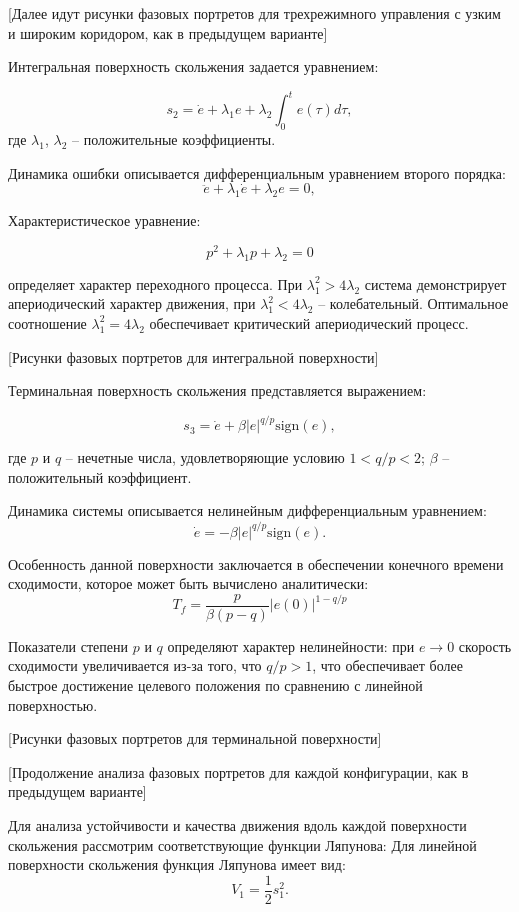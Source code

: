 [Далее идут рисунки фазовых портретов для трехрежимного управления с узким и широким коридором, как в предыдущем варианте]

Интегральная поверхность скольжения задается уравнением:

$$
	s_2 = \dot{e} + \lambda_1 e + \lambda_2 \int_0^t e(\tau)d\tau,
$$
где $\lambda_1$, $\lambda_2$ -- положительные коэффициенты.

Динамика ошибки описывается дифференциальным уравнением второго порядка:
$$
	\ddot{e} + \lambda_1 \dot{e} + \lambda_2 e = 0,
$$

Характеристическое уравнение:

$$
	p^2 + \lambda_1 p + \lambda_2 = 0
$$

определяет характер переходного процесса. При $\lambda_1^2 > 4\lambda_2$ система демонстрирует
апериодический характер движения, при $\lambda_1^2 < 4\lambda_2$ -- колебательный.
Оптимальное соотношение $\lambda_1^2 = 4\lambda_2$ обеспечивает критический апериодический процесс.

[Рисунки фазовых портретов для интегральной поверхности]

Терминальная поверхность скольжения представляется выражением:

$$
	s_3 = \dot{e} + \beta |e|^{q/p} \text{sign}(e),
$$

где $p$ и $q$ -- нечетные числа, удовлетворяющие условию $1 < q/p < 2$;
$\beta$ -- положительный коэффициент.

Динамика системы описывается нелинейным дифференциальным уравнением:
$$
	\dot{e} = -\beta |e|^{q/p} \text{sign}(e).
$$

Особенность данной поверхности заключается в обеспечении конечного
времени сходимости, которое может быть вычислено аналитически:
$$
	T_f = \frac{p}{\beta(p-q)}|e(0)|^{1-q/p}
$$

Показатели степени $p$ и $q$ определяют характер
нелинейности: при $e \to 0$ скорость сходимости
увеличивается из-за того, что $q/p > 1$, что обеспечивает более быстрое достижение
целевого положения по сравнению с линейной поверхностью.

[Рисунки фазовых портретов для терминальной поверхности]

[Продолжение анализа фазовых портретов для каждой конфигурации, как в предыдущем варианте]

Для анализа устойчивости и качества движения вдоль каждой поверхности
скольжения рассмотрим соответствующие функции Ляпунова:
Для линейной поверхности скольжения функция Ляпунова имеет вид:
$$
	V_1 = \frac{1}{2}s_1^2.
$$

